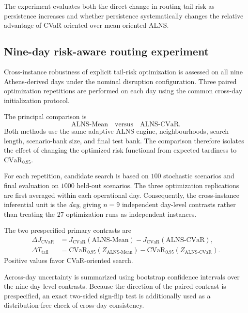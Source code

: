 \documentclass[preprint,12pt]{elsarticle}
\newcommand{\CVaR}{\mathrm{CVaR}}
\newcommand{\1}{\mathbf{1}}
\begin{document}
The experiment evaluates both the direct change in routing tail risk as
persistence increases and whether persistence systematically changes the
relative advantage of CVaR-oriented over mean-oriented ALNS.

\subsection{Nine-day risk-aware routing experiment}
\label{subsec:nine_day_experiment}

Cross-instance robustness of explicit tail-risk optimization is assessed on all
nine Athens-derived days under the nominal disruption configuration.
Three paired optimization repetitions are performed on each day using the
common cross-day initialization protocol.

The principal comparison is
\[
\text{ALNS-Mean}
\quad\text{versus}\quad
\text{ALNS-CVaR}.
\]
Both methods use the same adaptive ALNS engine, neighbourhoods, search length,
scenario-bank size, and final test bank. The comparison therefore isolates the
effect of changing the optimized risk functional from expected tardiness to
$\CVaR_{0.95}$.

For each repetition, candidate search is based on $100$ stochastic scenarios and
final evaluation on $1000$ held-out scenarios. The three optimization
replications are first averaged within each operational day. Consequently, the
cross-instance inferential unit is the \emph{day}, giving $n=9$ independent
day-level contrasts rather than treating the 27 optimization runs as independent
instances.

The two prespecified primary contrasts are
\begin{align}
	\Delta J_{\mathrm{CVaR}}
	&=
	J_{\mathrm{CVaR}}(\text{ALNS-Mean})
	-
	J_{\mathrm{CVaR}}(\text{ALNS-CVaR}),
	\label{eq:delta_j_cvar}
	\\
	\Delta T_{\mathrm{tail}}
	&=
	\CVaR_{0.95}(Z_{\text{ALNS-Mean}})
	-
	\CVaR_{0.95}(Z_{\text{ALNS-CVaR}}).
	\label{eq:delta_tail}
\end{align}
Positive values favor CVaR-oriented search.

Across-day uncertainty is summarized using bootstrap confidence intervals over
the nine day-level contrasts. Because the direction of the paired contrast is
prespecified, an exact two-sided sign-flip test is additionally used as a
distribution-free check of cross-day consistency.
\end{document}
